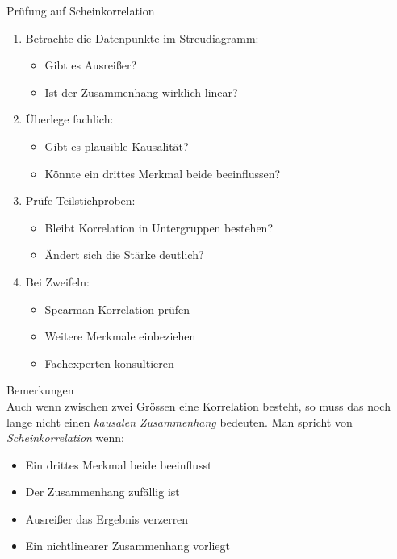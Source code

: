 \begin{KR}{Prüfung auf Scheinkorrelation}
\begin{enumerate}
    \item Betrachte die Datenpunkte im Streudiagramm:
        \begin{itemize}
            \item Gibt es Ausreißer?
            \item Ist der Zusammenhang wirklich linear?
        \end{itemize}
    \item Überlege fachlich:
        \begin{itemize}
            \item Gibt es plausible Kausalität?
            \item Könnte ein drittes Merkmal beide beeinflussen?
        \end{itemize}
    \item Prüfe Teilstichproben:
        \begin{itemize}
            \item Bleibt Korrelation in Untergruppen bestehen?
            \item Ändert sich die Stärke deutlich?
        \end{itemize}
    \item Bei Zweifeln:
        \begin{itemize}
            \item Spearman-Korrelation prüfen
            \item Weitere Merkmale einbeziehen
            \item Fachexperten konsultieren
        \end{itemize}
\end{enumerate}
\end{KR}

\begin{remark}{Bemerkungen}\\
Auch wenn zwischen zwei Grössen eine Korrelation besteht, so muss das noch lange nicht einen \emph{kausalen Zusammenhang} bedeuten. Man spricht von \emph{Scheinkorrelation} wenn:
\begin{itemize}
    \item Ein drittes Merkmal beide beeinflusst
    \item Der Zusammenhang zufällig ist
    \item Ausreißer das Ergebnis verzerren
    \item Ein nichtlinearer Zusammenhang vorliegt
\end{itemize}
\end{remark}

